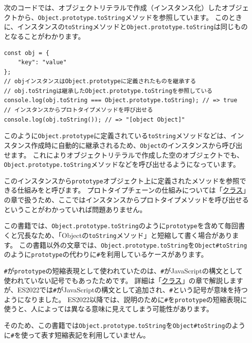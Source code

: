次のコードでは、オブジェクトリテラルで作成（インスタンス化）したオブジェクトから、\texttt{Object.prototype.toString}メソッドを参照しています。
このときに、インスタンスの\texttt{toString}メソッドと\texttt{Object.prototype.toString}は同じものとなることがわかります。

\begin{lstlisting}
const obj = {
    "key": "value"
};
// objインスタンスはObject.prototypeに定義されたものを継承する
// obj.toStringは継承したObject.prototype.toStringを参照している
console.log(obj.toString === Object.prototype.toString); // => true
// インスタンスからプロトタイプメソッドを呼び出せる
console.log(obj.toString()); // => "[object Object]"
\end{lstlisting}

このように\texttt{Object.prototype}に定義されている\texttt{toString}メソッドなどは、インスタンス作成時に自動的に継承されるため、\texttt{Object}のインスタンスから呼び出せます。
これによりオブジェクトリテラルで作成した空のオブジェクトでも、\texttt{Object.prototype.toString}メソッドなどを呼び出せるようになっています。

このインスタンスから\texttt{prototype}オブジェクト上に定義されたメソッドを参照できる仕組みを\textbf{}と呼びます。
プロトタイプチェーンの仕組みについては「\hyperlink{class}{クラス}」の章で扱うため、ここではインスタンスからプロトタイプメソッドを呼び出せるということがわかっていれば問題ありません。

\begin{tcolorbox}[enhanced jigsaw,breakable,title=\texttt{Object\#toString}という短縮した表記について]\label{prototype-shorthand-syntax}

この書籍では、\texttt{Object.prototype.toString}のように\texttt{prototype}を含めて毎回書くと冗長なため、「Objectの\texttt{toString}メソッド」と短縮して書く場合があります。
この書籍以外の文章では、\texttt{Object.prototype.toString}を\texttt{Object\#toString}のように\texttt{prototype}の代わりに\texttt{\#}を利用しているケースがあります。

\texttt{\#}が\texttt{prototype}の短縮表現として使われていたのは、\texttt{\#}がJavaScriptの構文として使われていない記号でもあったためです。
詳細は「\hyperlink{class}{クラス}」の章で解説しますが、ES2022では\texttt{\#}がJavaScriptの構文として追加され、\texttt{\#}という記号が意味を持つようになりました。
ES2022以降では、説明のために\texttt{\#}を\texttt{prototype}の短縮表現に使うと、人によっては異なる意味に見えてしまう可能性があります。

そのため、この書籍では\texttt{Object.prototype.toString}を\texttt{Object\#toString}のように\texttt{\#}を使って表す短縮表記を利用していません。
\end{tcolorbox}

